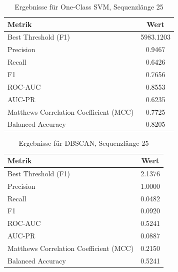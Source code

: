 \documentclass[a4paper,12pt]{article}
\begin{document}
	\begin{table}[H]
		\centering
		\begin{tabular}{l c}
			\hline
			Metrik & Wert \\
			\hline
			Best Threshold (F1) & 5983.1203 \\
			Precision & 0.9467 \\
			Recall & 0.6426 \\
			F1 & 0.7656 \\
			ROC-AUC & 0.8553 \\
			AUC-PR & 0.6235 \\
			Matthews Correlation Coefficient (MCC) & 0.7725 \\
			Balanced Accuracy & 0.8205 \\
			\hline
		\end{tabular}
		\caption{Ergebnisse für One-Class SVM, Sequenzlänge 25}
	\end{table}
	
	\begin{table}[H]
		\centering
		\begin{tabular}{l c}
			\hline
			Metrik & Wert \\
			\hline
			Best Threshold (F1) & 2.1376 \\
			Precision & 1.0000 \\
			Recall & 0.0482 \\
			F1 & 0.0920 \\
			ROC-AUC & 0.5241 \\
			AUC-PR & 0.0887 \\
			Matthews Correlation Coefficient (MCC) & 0.2150 \\
			Balanced Accuracy & 0.5241 \\
			\hline
		\end{tabular}
		\caption{Ergebnisse für DBSCAN, Sequenzlänge 25}
	\end{table}
	
	
\end{document}

